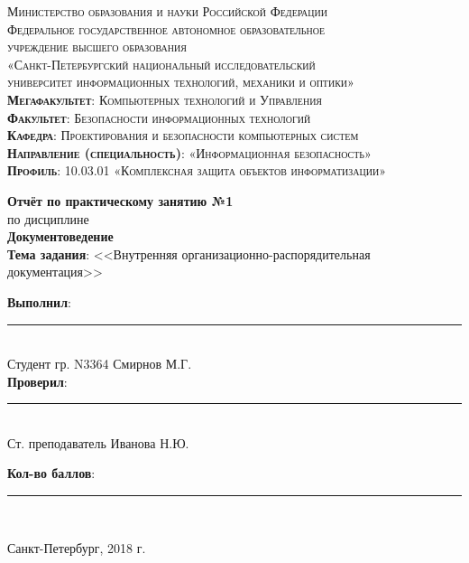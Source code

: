 \begin{titlepage}
	\begin{center}
		\textsc{
			\fontsize{12pt}{14pt}\selectfont
			Министерство образования и науки Российской Федерации\\
			Федеральное государственное автономное образовательное\\
			учреждение высшего образования\\
			«Санкт-Петербургский национальный исследовательский\\
			университет информационных технологий, механики и оптики»\\
			\textbf{Мегафакультет}:  Компьютерных технологий и Управления\\
			\textbf{Факультет}: Безопасности информационных технологий\\
			\textbf{Кафедра}: Проектирования и безопасности компьютерных систем\\
			\textbf{Направление (специальность)}: «Информационная безопасность»\\
			\textbf{Профиль}: 10.03.01 «Комплексная защита объектов информатизации»}
		
		\vfill
		
		\textbf{Отчёт по практическому занятию №1}\\
		по дисциплине\\
		\textbf{Документоведение}\\
	\vfill
	\textbf{Тема задания}: <<Внутренняя организационно-распорядительная документация>>\\
	\end{center}

	\vfill
	
	\begin{flushright}
	\textbf{Выполнил}: \rule{10em}{.1pt}\\
	Студент гр. N3364 Смирнов М.Г.\\
	\textbf{Проверил}: \rule{10em}{.1pt}\\
	Ст. преподаватель Иванова Н.Ю.
		\vfill

	\textbf{Кол-во баллов}: \rule{10em}{.1pt}\\

	\vfill
	


	\end{flushright}
	\vfill
	\begin{center}
		Санкт-Петербург, 2018 г.
	\end{center}
\end{titlepage}